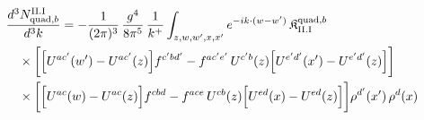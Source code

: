 \begin{align}\label{eq:H-II.I-2b}
&\frac{d^{3}N^{\rm II.I}_{{\rm quad},b}}{d^{3}k}=-\frac{1}{(2\pi)^{3}}\, \frac{g^{4}}{8\pi^{5}}\, \frac{1}{k^{+}} \int_{z,w,w',x,x'}e^{-ik\cdot(w-w')}\, \mathfrak{K}^{{\rm quad},b}_{\rm II.I}\notag\\
&\quad \times\bigg[\Big[U^{ac'}(w')-U^{ac'}(z)\Big]f^{c'bd'} -f^{ac'e'}\, U^{c'b}(z)\Big[U^{e'd'}(x')-U^{e'd'}(z)\Big]\bigg]\notag\\
&\quad \times\bigg[\Big[U^{ac}(w)-U^{ac}(z)\Big]f^{cbd} -f^{ace}\, U^{cb}(z)\Big[U^{ed}(x)-U^{ed}(z)\Big]\bigg]\rho^{d'}(x')\, \rho^{d}(x)
\end{align}
